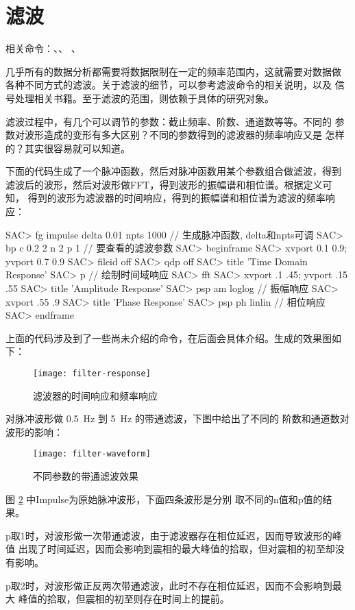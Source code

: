 \section{滤波}
相关命令：、、
、

几乎所有的数据分析都需要将数据限制在一定的频率范围内，这就需要对数据做
各种不同方式的滤波。关于滤波的细节，可以参考滤波命令的相关说明，以及
信号处理相关书籍。至于滤波的范围，则依赖于具体的研究对象。

滤波过程中，有几个可以调节的参数：截止频率、阶数、通道数等等。不同的
参数对波形造成的变形有多大区别？不同的参数得到的滤波器的频率响应又是
怎样的？其实很容易就可以知道。

下面的代码生成了一个脉冲函数，然后对脉冲函数用某个参数组合做滤波，得到
滤波后的波形，然后对波形做FFT，得到波形的振幅谱和相位谱。根据定义可知，
得到的波形为滤波器的时间响应，得到的振幅谱和相位谱为滤波的频率响应：
\begin{SACCode}
SAC> fg impulse delta 0.01 npts 1000   // 生成脉冲函数, delta和npts可调
SAC> bp c 0.2 2 n 2 p 1                // 要查看的滤波参数
SAC> beginframe
SAC> xvport 0.1 0.9; yvport 0.7 0.9
SAC> fileid off
SAC> qdp off
SAC> title 'Time Domain Response'
SAC> p                                // 绘制时间域响应
SAC> fft
SAC> xvport .1 .45; yvport .15 .55
SAC> title 'Amplitude Response'
SAC> psp am loglog                    // 振幅响应
SAC> xvport .55 .9
SAC> title 'Phase Response'
SAC> psp ph linlin                    // 相位响应
SAC> endframe
\end{SACCode}
上面的代码涉及到了一些尚未介绍的命令，在后面会具体介绍。生成的效果图如下：
\begin{figure}[H]
\centering
\texttt{[image: filter-response]}
\caption{滤波器的时间响应和频率响应}
\label{fig:filter-response}
\end{figure}

对脉冲波形做 \SI{0.5}{\Hz} 到 \SI{5}{\Hz} 的带通滤波，下图中给出了不同的
阶数和通道数对波形的影响：

\begin{figure}[H]
\centering
\texttt{[image: filter-waveform]}
\caption{不同参数的带通滤波效果}
\label{fig:filter-waveform}
\end{figure}
图 \ref{fig:filter-waveform} 中Impulse为原始脉冲波形，下面四条波形是分别
取不同的n值和p值的结果。

p取1时，对波形做一次带通滤波，由于滤波器存在相位延迟，因而导致波形的峰值
出现了时间延迟，因而会影响到震相的最大峰值的拾取，但对震相的初至却没有影响。

p取2时，对波形做正反两次带通滤波，此时不存在相位延迟，因而不会影响到最大
峰值的拾取，但震相的初至则存在时间上的提前。
